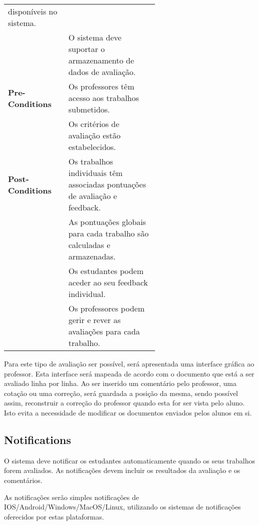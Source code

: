 \documentclass[10pt]{article}
\begin{document}
\begin{table}[H]
\begin{tabular}{|l|p{0.6\linewidth}|}
        disponíveis no sistema. \\
                              & O sistema deve suportar o armazenamento de dados de avaliação. \\
                              \hline
        \textbf{Pre-Conditions} & Os professores têm acesso aos trabalhos submetidos. \\
                                & Os critérios de avaliação estão estabelecidos. \\
                                \hline
        \textbf{Post-Conditions} & Os trabalhos individuais têm associadas pontuações de avaliação e feedback. \\
                                 & As pontuações globais para cada trabalho são calculadas e armazenadas. \\
                                 & Os estudantes podem aceder ao seu feedback individual. \\
                                 & Os professores podem gerir e rever as avaliações para cada trabalho. \\
                                 \hline
    \end{tabular}
\end{table}

Para este tipo de avaliação ser possível, será apresentada uma interface gráfica
ao professor.
Esta interface será mapeada de acordo com o documento que está a ser avaliado
linha por linha. Ao ser inserido um comentário pelo professor, uma cotação ou
uma correção, será guardada a posição da mesma, sendo possível assim, reconstruir
a correção do professor quando esta for ser vista pelo aluno. Isto evita a necessidade
de modificar os documentos enviados pelos alunos em si.

\newpage

\subsection{Notifications}
O sistema deve notificar os estudantes automaticamente quando os seus trabalhos forem avaliados. 
As notificações devem incluir os resultados da avaliação e os comentários. 

As notificações serão simples notificações de IOS/Android/Windows/MacOS/Linux, utilizando
os sistemas de notificações oferecidos por estas plataformas.
\end{document}
